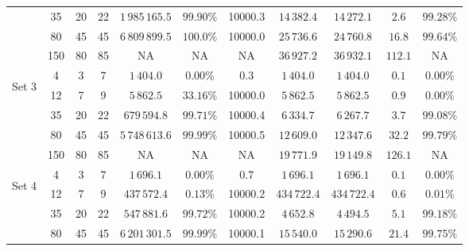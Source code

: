 \documentclass[../main.tex]{subfiles}
\begin{document}
\begin{table}
\begin{adjustbox}{width=0.95\columnwidth,center}
\begin{tabular}{|cccc|ccc|ccc|c|}
                        & 35      & 20    & 22    & $1\,985\,165.5$ & $99.90\%$     & 10000.3   & $14\,382.4$   & $14\,272.1$   & $2.6$     & $99.28\%$  \\
                        & 80      & 45    & 45    & $6\,809\,899.5$ & $100.0\%$     & 10000.0   & $25\,736.6$   & $24\,760.8$   & $16.8$    & $99.64\%$  \\
                        & 150     & 80    & 85    & NA              & NA            & NA        & $36\,927.2$   & $36\,932.1$   & $112.1$   & NA  \\
            \hline
                \multirow{5}{*}{\begin{sideways} Set 3 \end{sideways}}  
                        & 4       & 3     & 7     & $1\,404.0$      & $0.00\%$      & 0.3       & $1\,404.0$    & $1\,404.0$    & $0.1$     & $0.00\%$  \\
                        & 12      & 7     & 9     & $5\,862.5$      & $33.16\%$     & 10000.0   & $5\,862.5$    & $5\,862.5$    & $0.9$     & $0.00\%$  \\
                        & 35      & 20    & 22    & $679\,594.8$    & $99.71\%$     & 10000.4   & $6\,334.7$    & $6\,267.7$    & $3.7$     & $99.08\%$  \\
                        & 80      & 45    & 45    & $5\,748\,613.6$ & $99.99\%$     & 10000.5   & $12\,609.0$   & $12\,347.6$   & $32.2$    & $99.79\%$  \\
                        & 150     & 80    & 85    & NA              & NA            & NA        & $19\,771.9$   & $19\,149.8$   & $126.1$   & NA  \\
            \hline
                \multirow{5}{*}{\begin{sideways} Set 4 \end{sideways}}  
                        & 4       & 3     & 7     & $1\,696.1$      & $0.00\%$      & 0.7       & $1\,696.1$    & $1\,696.1$    & $0.1$     & $0.00\%$  \\
                        & 12      & 7     & 9     & $437\,572.4$    & $0.13\%$      & 10000.2   & $434\,722.4$  & $434\,722.4$  & $0.6$     & $0.01\%$  \\
                        & 35      & 20    & 22    & $547\,881.6$    & $99.72\%$     & 10000.2   & $4\,652.8$    & $4\,494.5$    & $5.1$     & $99.18\%$  \\
                        & 80      & 45    & 45    & $6\,201\,301.5$ & $99.99\%$     & 10000.1   & $15\,540.0$   & $15\,290.6$   & $21.4$    & $99.75\%$  \\

\end{tabular}
\end{adjustbox}
\end{table}
\end{document}
